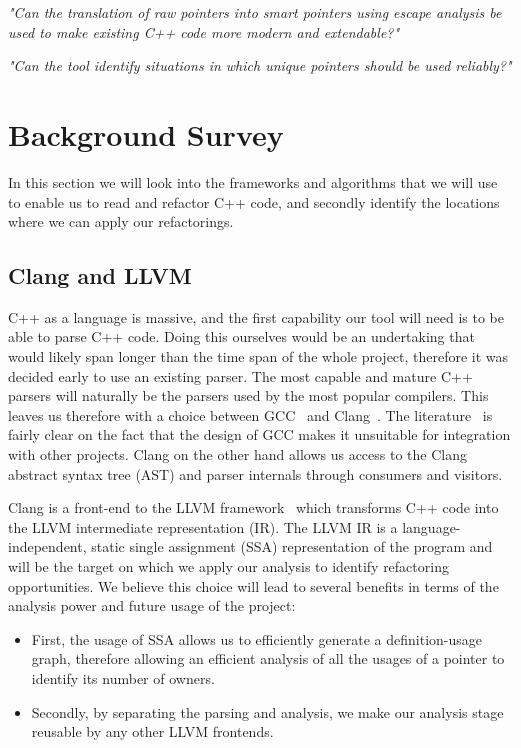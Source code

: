 \documentclass{proposal}
\begin{document}
    \emph{"Can the translation of raw pointers into smart pointers using escape analysis be used to make existing C++ code more modern and extendable?"}

    \emph{"Can the tool identify situations in which unique pointers should be used reliably?"}




    \section{Background Survey}\label{sec:background-survey}

    In this section we will look into the frameworks and algorithms that we will use to enable us to read and refactor C++ code, and secondly identify the locations where we can apply our refactorings.

    \subsection{Clang and LLVM}\label{subsec:clang-and-llvm}

    C++ as a language is massive, and the first capability our tool will need is to be able to parse C++ code.
    Doing this ourselves would be an undertaking that would likely span longer than the time span of the whole project, therefore it was decided early to use an existing parser.
    The most capable and mature C++ parsers will naturally be the parsers used by the most popular compilers.
    This leaves us therefore with a choice between GCC~\cite{GCC} and Clang~\cite{Clang}.
    The literature~\cite{duffy2014} is fairly clear on the fact that the design of GCC makes it unsuitable for integration with other projects.
    Clang on the other hand allows us access to the Clang abstract syntax tree (AST) and parser internals through consumers and visitors.

    Clang is a front-end to the LLVM framework~\cite{Lattner2004} which transforms C++ code into the LLVM intermediate representation (IR).
    The LLVM IR is a language-independent, static single assignment (SSA) representation of the program and will be the target on which we apply our analysis to identify refactoring opportunities.
    We believe this choice will lead to several benefits in terms of the analysis power and future usage of the project:
    \begin{itemize}
        \item First, the usage of SSA allows us to efficiently generate a definition-usage graph, therefore allowing an efficient analysis of all the usages of a pointer to identify its number of owners.
        \item Secondly, by separating the parsing and analysis, we make our analysis stage reusable by any other LLVM frontends.
    \end{itemize}
\end{document}
